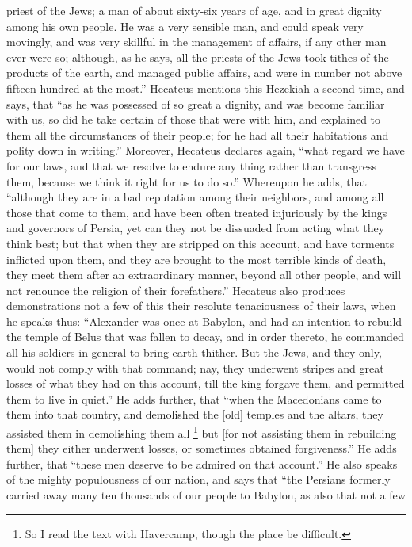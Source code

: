 priest of the Jews; a man of about sixty-six years of age, and in great
dignity among his own people. He was a very sensible man, and could speak
very movingly, and was very skillful in the management of affairs, if any
other man ever were so; although, as he says, all the priests of the Jews
took tithes of the products of the earth, and managed public affairs, and
were in number not above fifteen hundred at the most.'' Hecateus mentions
this Hezekiah a second time, and says, that ``as he was possessed of so
great a dignity, and was become familiar with us, so did he take certain
of those that were with him, and explained to them all the circumstances
of their people; for he had all their habitations and polity down in
writing.'' Moreover, Hecateus declares again, ``what regard we have for our
laws, and that we resolve to endure any thing rather than transgress them,
because we think it right for us to do so.'' Whereupon he adds, that
``although they are in a bad reputation among their neighbors, and among
all those that come to them, and have been often treated injuriously by
the kings and governors of Persia, yet can they not be dissuaded from
acting what they think best; but that when they are stripped on this
account, and have torments inflicted upon them, and they are brought to
the most terrible kinds of death, they meet them after an extraordinary
manner, beyond all other people, and will not renounce the religion of
their forefathers.'' Hecateus also produces demonstrations not a few of
this their resolute tenaciousness of their laws, when he speaks thus:
``Alexander was once at Babylon, and had an intention to rebuild the temple
of Belus that was fallen to decay, and in order thereto, he commanded all
his soldiers in general to bring earth thither. But the Jews, and they
only, would not comply with that command; nay, they underwent stripes and
great losses of what they had on this account, till the king forgave them,
and permitted them to live in quiet.'' He adds further, that ``when the
Macedonians came to them into that country, and demolished the [old]
temples and the altars, they assisted them in demolishing them all \footnote{So I read the text with
Havercamp, though the place be difficult.}
but [for not assisting them in rebuilding them] they either underwent
losses, or sometimes obtained forgiveness.'' He adds further, that ``these
men deserve to be admired on that account.'' He also speaks of the mighty
populousness of our nation, and says that ``the Persians formerly carried
away many ten thousands of our people to Babylon, as also that not a few
